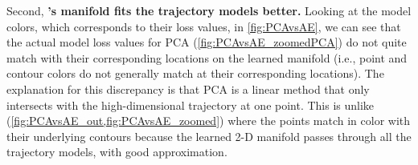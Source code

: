 \documentclass[letterpaper]{article} %
\begin{document}
            Second, \textbf{\proposedautencoder{}'s manifold fits the trajectory models better.} Looking at the model colors, which corresponds to their loss values, in \cref{fig:PCAvsAE}, we can see that the actual model loss values for PCA (\cref{fig:PCAvsAE_zoomedPCA}) do not quite match with their corresponding locations on the learned manifold (i.e., point and contour colors do not generally match at their corresponding locations). 
            The explanation for this discrepancy is that PCA is a linear method that only intersects with the high-dimensional trajectory at one point.
            This is unlike \proposedautencoder{} (\cref{fig:PCAvsAE_out,fig:PCAvsAE_zoomed}) where the points match in color with their underlying contours because the learned 2-D manifold passes through all the trajectory models, with good approximation. 
\end{document}

